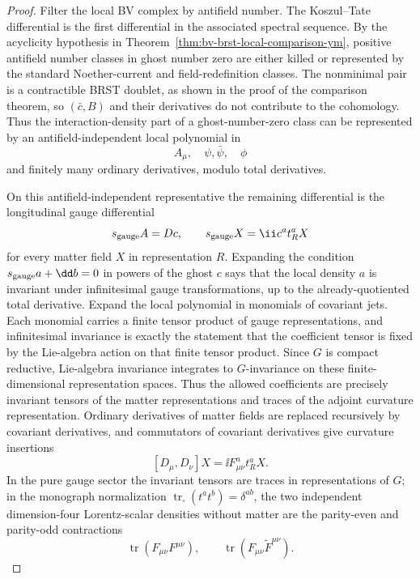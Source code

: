 \begin{proof}
Filter the local BV complex by antifield number.  The Koszul--Tate
differential is the first differential in the associated spectral sequence.
By the acyclicity hypothesis in
Theorem~\ref{thm:bv-brst-local-comparison-ym}, positive antifield number
classes in ghost number zero are either killed or represented by the standard
Noether-current and field-redefinition classes.  The nonminimal pair is a
contractible BRST doublet, as shown in the proof of the comparison theorem,
so \((\bar c,B)\) and their derivatives do not contribute to the cohomology.
Thus the interaction-density part of a ghost-number-zero class can be
represented by an antifield-independent local polynomial in
\[
  A_\mu,\quad \psi,\bar\psi,\quad \phi
\]
and finitely many ordinary derivatives, modulo total derivatives.

On this antifield-independent representative the remaining differential is
the longitudinal gauge differential
\[
  s_{\rm gauge}A=Dc,\qquad
  s_{\rm gauge}X=\ii c^at_R^aX
\]
for every matter field \(X\) in representation \(R\).  Expanding the
condition \(s_{\rm gauge}a+\dd b=0\) in powers of the ghost \(c\) says that
the local density \(a\) is invariant under infinitesimal gauge
transformations, up to the already-quotiented total derivative.  Expand the
local polynomial in monomials of covariant jets.  Each monomial carries a
finite tensor product of gauge representations, and infinitesimal invariance
is exactly the statement that the coefficient tensor is fixed by the
Lie-algebra action on that finite tensor product.  Since \(G\) is compact
reductive, Lie-algebra invariance integrates to \(G\)-invariance on these
finite-dimensional representation spaces.  Thus the allowed coefficients are
precisely invariant tensors of the matter representations and traces of the
adjoint curvature representation.  Ordinary derivatives of matter fields are
replaced recursively by covariant derivatives, and commutators of covariant
derivatives give curvature insertions
\[
  [D_\mu,D_\nu]X=\ii F_{\mu\nu}^a t_R^aX .
\]
In the pure gauge sector the invariant tensors are traces in representations
of \(G\); in the monograph normalization
\(\operatorname{tr}_{\square}(t^at^b)=\delta^{ab}\), the two independent
dimension-four Lorentz-scalar densities without matter are the parity-even
and parity-odd contractions
\[
  \operatorname{tr}(F_{\mu\nu}F^{\mu\nu}),
  \qquad
  \operatorname{tr}(F_{\mu\nu}\widetilde F^{\mu\nu}) .
\]


\end{proof}
